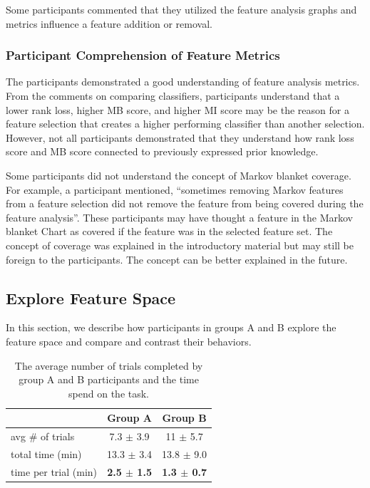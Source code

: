 Some participants commented that they utilized the feature analysis graphs and metrics influence a feature addition or removal.

\subsubsection { Participant Comprehension of Feature Metrics}
The participants demonstrated a good understanding of feature analysis metrics. From the comments on comparing classifiers, participants understand that a lower rank loss, higher MB score, and higher MI score may be the reason for a feature selection that creates a higher performing classifier than another selection. However, not all participants demonstrated that they understand how rank loss score and MB score connected to previously expressed prior knowledge.

Some participants did not understand the concept of Markov blanket coverage. For example, a participant mentioned, “sometimes removing Markov features from a feature selection did not remove the feature from being covered during the feature analysis”. These participants may have thought a feature in the Markov blanket Chart as covered if the feature was in the selected feature set. The concept of coverage was explained in the introductory material but may still be foreign to the participants. The concept can be better explained in the future.

\subsection{ Explore Feature Space}
In this section, we describe how participants in groups A and B explore the feature space and compare and contrast their behaviors.

\begin{table}[]
\centering
\begin{tabular}{lcc}
\hline
                     & Group A & Group B \\ \hline
avg \# of trials     & 7.3 $\pm$ 3.9  & 11  $\pm$ 5.7 \\
total time (min)     & 13.3 $\pm$ 3.4  & 13.8  $\pm$ 9.0  \\
time per trial (min) & \textbf{2.5 $\pm$ 1.5} & \textbf{1.3 $\pm$ 0.7} \\ \hline
\end{tabular}
\caption{The average number of trials completed by group A and B participants and the time spend on the task. }
\label{versionAvsversionB}
\end{table}

